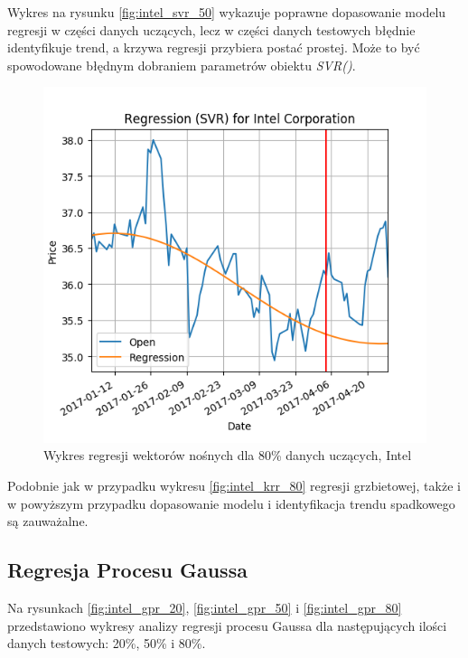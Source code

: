 Wykres na rysunku \ref{fig:intel_svr_50} wykazuje poprawne dopasowanie modelu regresji w części danych uczących, lecz w części danych testowych błędnie identyfikuje trend, a krzywa regresji przybiera postać prostej.
Może to być spowodowane błędnym dobraniem parametrów obiektu \textit{SVR()}.\\

\begin{figure}[h!]
\centering
\includegraphics[width=150mm]{pictures/plots/intel_svr_80.png}
\caption{Wykres regresji wektorów nośnych dla 80\% danych uczących, Intel}
\label{fig:intel_svr_80}
\end{figure}

Podobnie jak w przypadku wykresu \ref{fig:intel_krr_80} regresji grzbietowej, także i w powyższym przypadku dopasowanie modelu i identyfikacja trendu spadkowego są zauważalne.\\

\subsection{Regresja Procesu Gaussa}

Na rysunkach \ref{fig:intel_gpr_20}, \ref{fig:intel_gpr_50} i \ref{fig:intel_gpr_80} przedstawiono wykresy analizy regresji procesu Gaussa dla następujących ilości danych testowych: 20\%, 50\% i 80\%.\\

